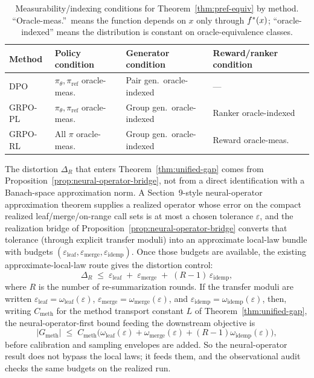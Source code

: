\begin{table}[htbp]
\centering\small
\begin{tabular}{llll}
\toprule
Method & Policy condition & Generator condition & Reward/ranker condition \\
\midrule
DPO & $\pi_\theta, \pi_{\mathrm{ref}}$ oracle-meas.\ & Pair gen.\ oracle-indexed & --- \\
GRPO-PL & $\pi_\theta, \pi_{\mathrm{ref}}$ oracle-meas.\ & Group gen.\ oracle-indexed & Ranker oracle-indexed \\
GRPO-RL & All $\pi$ oracle-meas.\ & Group gen.\ oracle-indexed & Reward oracle-meas.\ \\
\bottomrule
\end{tabular}
\caption{Measurability/indexing conditions for Theorem~\ref{thm:pref-equiv} by method. ``Oracle-meas.''\ means the function depends on $x$ only through $f^\ast(x)$; ``oracle-indexed'' means the distribution is constant on oracle-equivalence classes.}
\label{tab:measurability}
\end{table}

The distortion $\Delta_R$ that enters Theorem~\ref{thm:unified-gap}
comes from Proposition~\ref{prop:neural-operator-bridge},
not from a direct identification with a Banach-space approximation
norm. A Section~9-style
neural-operator approximation theorem supplies a realized operator whose
error on the compact realized leaf/merge/on-range call sets is at most a
chosen tolerance $\varepsilon$, and the realization bridge of
Proposition~\ref{prop:neural-operator-bridge} converts that
tolerance (through explicit transfer moduli) into an approximate
local-law bundle with budgets
$(\varepsilon_{\mathrm{leaf}}, \varepsilon_{\mathrm{merge}},
\varepsilon_{\mathrm{idemp}})$. Once those budgets are available, the
existing approximate-local-law route gives the distortion control:
\[
\Delta_R \;\le\;
\varepsilon_{\mathrm{leaf}}
\;+\;
\varepsilon_{\mathrm{merge}}
\;+\;
(R-1)\,\varepsilon_{\mathrm{idemp}},
\]
where $R$ is the number of re-summarization rounds. If the transfer
moduli are written
$\varepsilon_{\mathrm{leaf}}=\omega_{\mathrm{leaf}}(\varepsilon)$,
$\varepsilon_{\mathrm{merge}}=\omega_{\mathrm{merge}}(\varepsilon)$, and
$\varepsilon_{\mathrm{idemp}}=\omega_{\mathrm{idemp}}(\varepsilon)$,
then, writing $C_{\mathrm{meth}}$ for the method transport constant $L$
of Theorem~\ref{thm:unified-gap}, the neural-operator-first bound
feeding the downstream objective is
\[
|G_{\mathrm{meth}}|
\;\le\;
C_{\mathrm{meth}}\Big(
\omega_{\mathrm{leaf}}(\varepsilon)
+\omega_{\mathrm{merge}}(\varepsilon)
+(R-1)\omega_{\mathrm{idemp}}(\varepsilon)
\Big),
\]
before calibration and sampling envelopes are added. So the
neural-operator result does not bypass the local laws; it feeds them,
and the observational audit checks the same budgets on the realized run.

